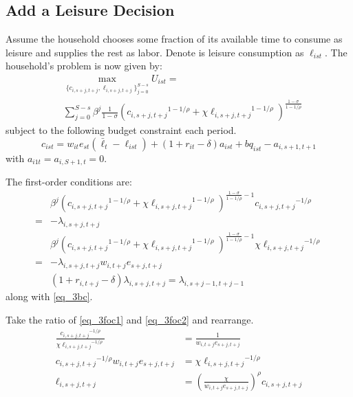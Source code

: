 \documentclass[letterpaper,12pt]{article}
\theoremstyle{definition}
\numberwithin{equation}{section}
\begin{document}
\begin{spacing}{1.5}
\section{Add a Leisure Decision}
	Assume the household chooses some fraction of its available time to consume as leisure and supplies the rest as labor.  Denote is leisure consumption as $\ell_{ist}$.  The household's problem is now given by:
	\begin{equation}
		\begin{split}
		& \max_{\{c_{i,s+j,t+j},\ell_{i,s+j,t+j}\}_{j=0}^{S-s}} U_{ist} = \\
		& \sum_{j=0}^{S-s} \beta^j \frac{1}{1-\sigma} \left( {c_{i,s+j,t+j}}^{1-1/\rho} + \chi {\ell_{i,s+j,t+j}}^{1-1/\rho}\right)^{\tfrac{{1-\sigma}}{1-1/\rho}}  \nonumber
		\end{split}
	\end{equation}
	subject to the following budget constraint each period.
	\begin{equation} \label{eq_3bc}
		c_{ist} = w_{it} e_{st} (\bar \ell_t -\ell_{ist}) + (1+r_{it}-\delta)a_{ist} + bq_{ist} - a_{i,s+1,t+1}
	\end{equation}
	with $a_{i1t} = a_{i,S+1,t} = 0$.

	The first-order conditions are:
	\begin{align}
		& \beta^j \left( {c_{i,s+j,t+j}}^{1-1/\rho} + \chi {\ell_{i,s+j,t+j}}^{1-1/\rho}\right)^{\tfrac{{1-\sigma}}{1-1/\rho}-1} {c_{i,s+j,t+j}}^{-1/\rho}  \nonumber \\ = &  - \lambda_{i,s+j,t+j}  \label{eq_3foc1} \\
		& \beta^j \left( {c_{i,s+j,t+j}}^{1-1/\rho} + \chi {\ell_{i,s+j,t+j}}^{1-1/\rho}\right)^{\tfrac{{1-\sigma}}{1-1/\rho}-1} \chi {\ell_{i,s+j,t+j}}^{-1/\rho} \nonumber \\ = & - \lambda_{i,s+j,t+j} w_{i,t+j} e_{s+j,t+j} \label{eq_3foc2} \\
        & (1+r_{i,t+j}-\delta) \lambda_{i,s+j,t+j} = \lambda_{i,s+j-1,t+j-1} \label{eq_3foc3}
	\end{align}	
	along with \eqref{eq_3bc}.

	Take the ratio of \eqref{eq_3foc1} and \eqref{eq_3foc2} and rearrange.
	\begin{align}
		\frac{{c_{i,s+j,t+j}}^{-1/\rho}} {\chi {\ell_{i,s+j,t+j}}^{-1/\rho}} \nonumber & = \frac{1} {w_{i,t+j} e_{s+j,t+j}} \nonumber \\
		{c_{i,s+j,t+j}}^{-1/\rho} w_{i,t+j} e_{s+j,t+j} & = \chi {\ell_{i,s+j,t+j}}^{-1/\rho} \nonumber \\
		\ell_{i,s+j,t+j} & = \left(\frac{\chi} {w_{i,t+j} e_{s+j,t+j}}\right)^{\rho} c_{i,s+j,t+j} \label{eq_3elldef}
	\end{align}	


\end{spacing}
\end{document}
